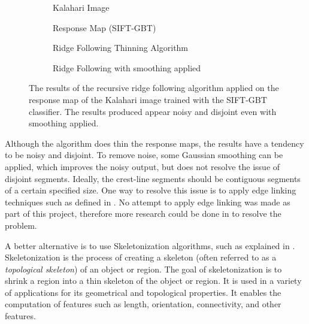 \begin{figure}
	\centering
	\begin{subfigure}{0.48\textwidth}
		\centering
		\caption{Kalahari Image}
		\label{fig:thinning_kalahari}
	\end{subfigure}
	\begin{subfigure}{0.48\textwidth}
		\centering
		\caption{ Response Map (SIFT-GBT) }
		\label{fig:thinning_kalahari_response}
	\end{subfigure}
	\begin{subfigure}{0.8\textwidth}
		\centering
		\caption{ Ridge Following Thinning Algorithm }
		\label{fig:thinning1_kalahari}
	\end{subfigure}
	\begin{subfigure}{0.8\textwidth}
		\centering
		\caption{ Ridge Following with smoothing applied }
		\label{fig:thinning1_kalahari_smooth}
	\end{subfigure}
	\caption{The results of the recursive ridge following algorithm applied on the response map of the Kalahari image trained with the SIFT-GBT classifier. The results produced appear noisy and disjoint even with smoothing applied. }
	\label{fig:ridge_follow_results}
\end{figure}

Although the algorithm does thin the response maps, the results have a tendency to be noisy and disjoint. To remove noise, some Gaussian smoothing can be applied, which improves the noisy output, but does not resolve the issue of disjoint segments. Ideally, the crest-line segments should be contiguous segments of a certain specified size. One way to resolve this issue is to apply edge linking techniques such as defined in \cite{1986_canny_edge_detection}. No attempt to apply edge linking was made as part of this project, therefore more research could be done in to resolve the problem.

A better alternative is to use Skeletonization algorithms, such as explained in \cite{segmentation-free-skeletonization-grayscale-volumes,skeleton-pruning-contour-partitioning-discrete-curve-evolution,automatic-medial-axis-pruning-mapping-characteristics,fast-parallel-algorithm-thinning}. Skeletonization is the process of creating a skeleton (often referred to as a \emph{topological skeleton}) of an object or region. The goal of skeletonization is to shrink a region into a thin skeleton of the object or region. It is used in a variety of applications for its geometrical and topological properties. It enables the computation of features such as length, orientation, connectivity, and other features. 

